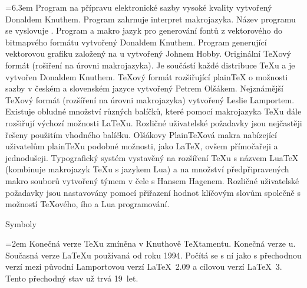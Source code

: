 \medskip
\bgroup \leftskip=6.3em
\abbrv[\TeX{}]  Program na přípravu elektronické sazby vysoké kvality
   vytvořený Donaldem Knuthem. Program zahrnuje interpret makrojazyka.
   Název programu se vyslovuje .
\abbrv[\METAFONT{}] Program a makro jazyk pro generování fontů
   z vektorového do bitmapvého formátu vytvořený Donaldem Knuthem.
\abbrv[\METAPOST{}] Program generující vektorovou grafiku založený na
   \METAFONT{}u vytvořený Johnem Hobby.
  Originální \TeX{}ový formát (rošiření na úrovni 
   makrojazyka). Je součástí každé distribuce \TeX{}u a je
   vytvořen Donaldem Knuthem.
\abbrv[\csplain{}] \TeX{}ový formát rozšiřující plain\TeX{} o možnosti sazby
   v českém a slovenském jazyce vytvořený Petrem Olšákem.
\abbrv[\LaTeX{}]  Nejznámější \TeX{}ový formát (rozšíření na úrovni 
   makrojazyka) vytvořený Leslie Lamportem. 
   Existuje obludné množství různých balíčků, které pomocí
   makrojazyka \TeX{}u dále rozšiřují výchozí možnosti \LaTeX{}u.
   Rozličné uživatelské požadavky jsou nejčastěji řešeny použitím vhodného balíčku.
\abbrv[OPmac] Olšákovy Plain\TeX{}ová makra nabízející uživatelům
   plain\TeX{}u podobné možnosti, jako \LaTeX{}, ovšem přímočařeji
   a jednodušeji.
  Typografický systém vystavěný na rozšíření \TeX{}u s
   názvem Lua\TeX{} (kombinuje makrojazyk \TeX{}u s jazykem Lua) a na množství
   předpřipravených makro souborů vytvořený týmem v čele s Hansem Hagenem.
   Rozličné uživatelské požadavky jsou nastavovány pomocí přiřazení hodnot
   klíčovým slovům společně s možností \TeX{}ového, \METAPOST{}ího a 
   Lua programování.
\par\egroup


\sec Symboly

\medskip
\bgroup \leftskip=2em
\abbrv[$\pi$] Konečná verze \TeX{}u zmíněna v Knuthově \TeX{}tamentu.
\abbrv[e] Konečná verze \METAFONT{}u.
\abbrv[$2\varepsilon$] Současná verze \LaTeX{}u používaná od roku 1994.
Počítá se s ní jako s přechodnou verzí mezi původní Lamportovou 
verzí \LaTeX{}~2.09 a cílovou verzí \LaTeX{}~3. Tento přechodný stav už trvá
19~let.
\par\egroup



